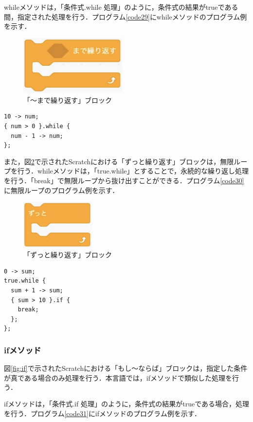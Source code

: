 \documentclass[10pt,a4j]{ltjsarticle}
\begin{document}
whileメソッドは，「条件式.while 処理」のように，条件式の結果がtrueである間，指定された処理を行う．プログラム\ref{code29}にwhileメソッドのプログラム例を示す．

\begin{figure}[H]
  \centering
  \includegraphics[height=30mm]{images/while.pdf} 
  \caption{「〜まで繰り返す」ブロック}
  \label{fig:while}
\end{figure}

\begin{lstlisting}[caption=whileメソッドのプログラム例, label=code29]
10 -> num;
{ num > 0 }.while {
  num - 1 -> num;
};
\end{lstlisting}

また，図\ref{fig:while}で示されたScratchにおける「ずっと繰り返す」ブロックは，無限ループを行う．whileメソッドは，「true.while」とすることで，永続的な繰り返し処理を行う．「break」で無限ループから抜け出すことができる．プログラム\ref{code30}に無限ループのプログラム例を示す．

\begin{figure}[H]
  \centering
  \includegraphics[height=25mm]{images/truewhile.pdf} 
  \caption{「ずっと繰り返す」ブロック}
  \label{fig:while}
\end{figure}

\begin{lstlisting}[caption=無限ループのプログラム例, label=code30]
0 -> sum;
true.while {
  sum + 1 -> sum;
  { sum > 10 }.if {
    break;
  };
};
\end{lstlisting}
\subsubsection{ifメソッド}
図\ref{fig:if}で示されたScratchにおける「もし〜ならば」ブロックは，指定した条件が真である場合のみ処理を行う．本言語では，ifメソッドで類似した処理を行う．

ifメソッドは，「条件式.if 処理」のように，条件式の結果がtrueである場合，処理を行う．プログラム\ref{code31}にifメソッドのプログラム例を示す．
\end{document}
